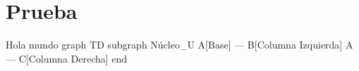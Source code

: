 
\section{Prueba}
Hola mundo
graph TD
    subgraph Núcleo_U
    A[Base] --- B[Columna Izquierda]
    A --- C[Columna Derecha]
    end

